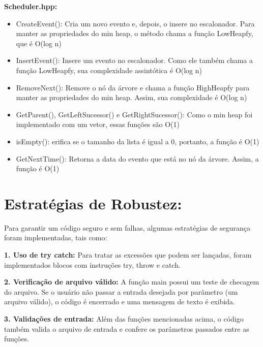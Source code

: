\documentclass[11pt]{article}
\begin{document}
    \par\textbf{Scheduler.hpp:}
    \begin{itemize}
        \item CreateEvent(): Cria um novo evento e, depois, o insere no escalonador. Para manter as propriedades do min heap, o método chama a função LowHeapfy, que é O(log n)
        \item InsertEvent(): Insere um evento no escalonador. Como ele também chama a função LowHeapfy, sua complexidade assintótica é O(log n)
        \item RemoveNext(): Remove o nó da árvore e chama a função HighHeapfy para manter as propriedades do min heap. Assim, sua complexidade é O(log n)
        \item GetParent(), GetLeftSucessor() e GetRightSucessor(): Como o min heap foi implementado com um vetor, essas funções são O(1)
        \item isEmpty(): erifica se o tamanho da lista é igual a 0, portanto, a função é O(1)
        \item GetNextTime(): Retorna a data do evento que está no nó da árvore. Assim, a função é O(1)
    \end{itemize}


\section*{Estratégias de Robustez:}
\par Para garantir um código seguro e sem falhas, algumas estratégias de segurança foram implementadas,
tais como:

\par\textbf{1. Uso de try catch:} Para tratar as excessões que podem ser lançadas, foram implementados blocos com instruções try, throw e catch.

\par\textbf{2. Verificação de arquivo válido:} A função main possui um teste de checagem do arquivo. Se o usuário não passar a entrada desejada por parâmetro (um arquivo válido), o código é
encerrado e uma mensagem de texto é exibida.

\par\textbf{3. Validações de entrada:} Além das funções mencionadas acima, o código também valida o arquivo de entrada e  confere os parâmetros passados entre as funções.


\end{document}
